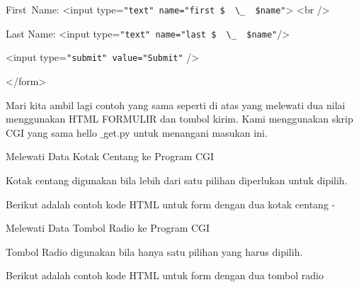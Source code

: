 \begin {enumerate}
\begin {enumerate}
First~Name: <input type=\verb|"text" name="first $  \_  $name"|> <br />

Last Name: <input type=\verb|"text" name="last $  \_  $name"|/>

<input type=\verb|"submit" value="Submit"| />

</form>

Mari kita ambil lagi contoh yang sama seperti di atas yang melewati dua nilai menggunakan HTML FORMULIR dan tombol kirim. Kami menggunakan skrip CGI yang sama hello $  \_  $get.py untuk menangani masukan ini.

Melewati Data Kotak Centang ke Program CGI

Kotak centang digunakan bila lebih dari satu pilihan diperlukan untuk dipilih.

Berikut adalah contoh kode HTML untuk form dengan dua kotak centang -

Melewati Data Tombol Radio ke Program CGI

Tombol Radio digunakan bila hanya satu pilihan yang harus dipilih.

Berikut adalah contoh kode HTML untuk form dengan dua tombol radio


\end{enumerate}
\end{enumerate}
